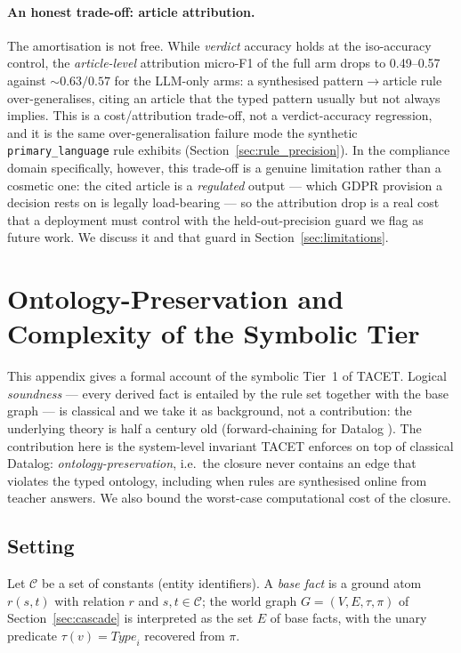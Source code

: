 \documentclass[11pt]{article}
\theoremstyle{plain}
\newcommand{\privArtFOneFullGemini}{0.49}
\newcommand{\privArtFOneLlmClaude}{0.57}
\newcommand{\privArtFOneFullGrok}{0.57}
\newcommand{\privArtFOneLlmGrok}{0.63}
\begin{document}
\paragraph{An honest trade-off: article attribution.} The amortisation is not
free. While \emph{verdict} accuracy holds at the iso-accuracy control, the
\emph{article-level} attribution micro-F1 of the full arm drops to
\privArtFOneFullGemini--\privArtFOneFullGrok{} against
${\sim}\privArtFOneLlmGrok/\privArtFOneLlmClaude{}$ for the LLM-only arms: a synthesised pattern$\to$article
rule over-generalises, citing an article that the typed pattern usually but not
always implies. This is a cost/attribution trade-off, not a verdict-accuracy
regression, and it is the same over-generalisation failure mode the synthetic
\texttt{primary\_language} rule exhibits (Section~\ref{sec:rule_precision}). In the
compliance domain specifically, however, this trade-off is a genuine limitation
rather than a cosmetic one: the cited article is a \emph{regulated} output ---
which GDPR provision a decision rests on is legally load-bearing --- so the
attribution drop is a real cost that a deployment must control with the
held-out-precision guard we flag as future work. We discuss it and that guard in
Section~\ref{sec:limitations}.

\section{Ontology-Preservation and Complexity of the Symbolic Tier}
\label{sec:soundness}

This appendix gives a formal account of the symbolic Tier~1 of TACET.
Logical \emph{soundness} --- every derived fact is entailed by the rule
set together with the base graph --- is classical and we take it as
background, not a contribution: the underlying theory is half a century
old (forward-chaining for Datalog \cite{abiteboul1995foundations}).  The
contribution here is the system-level invariant TACET enforces on top of
classical Datalog: \emph{ontology-preservation}, i.e.\ the closure never
contains an edge that violates the typed ontology, including when rules
are synthesised online from teacher answers.  We also bound the
worst-case computational cost of the closure.

\subsection{Setting}
\label{sec:soundness-setting}

Let $\mathcal{C}$ be a set of constants (entity identifiers).
A \emph{base fact} is a ground atom $r(s, t)$ with relation $r$ and
$s, t \in \mathcal{C}$; the world graph
$G = (V, E, \tau, \pi)$ of Section~\ref{sec:cascade} is interpreted as
the set $E$ of base facts, with the unary predicate
$\tau(v) = \mathit{Type}_i$ recovered from $\pi$.
\end{document}
